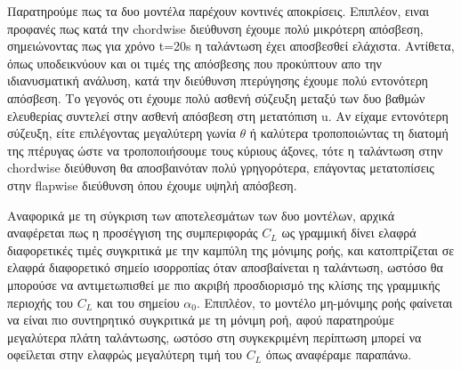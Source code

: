 \newpage
Παρατηρούμε πως τα δυο μοντέλα παρέχουν κοντινές αποκρίσεις. Επιπλέον, ειναι προφανές πως κατά την chordwise διεύθυνση έχουμε πολύ μικρότερη απόσβεση, σημειώνοντας πως για χρόνο t=20s η ταλάντωση έχει αποσβεσθεί ελάχιστα. Αντίθετα, όπως υποδεικνύουν και οι τιμές της απόσβεσης που προκύπτουν απο την ιδιανυσματική ανάλυση, κατά την διεύθυνση πτερύγησης έχουμε πολύ εντονότερη απόσβεση. Το γεγονός οτι έχουμε πολύ ασθενή σύζευξη μεταξύ των δυο βαθμών ελευθερίας συντελεί στην ασθενή απόσβεση στη μετατόπιση u. Αν είχαμε εντονότερη σύζευξη, είτε επιλέγοντας μεγαλύτερη γωνία $\theta$ ή καλύτερα τροποποιώντας τη διατομή της πτέρυγας ώστε να τροποποιήσουμε τους κύριους άξονες, τότε η ταλάντωση στην chordwise διεύθυνση θα αποσβαινόταν πολύ γρηγορότερα, επάγοντας μετατοπίσεις στην flapwise διεύθυνση όπου έχουμε υψηλή απόσβεση.

Αναφορικά με τη σύγκριση των αποτελεσμάτων των δυο μοντέλων, αρχικά αναφέρεται πως η προσέγγιση της συμπεριφοράς $C_L$ ως γραμμική δίνει ελαφρά διαφορετικές τιμές συγκριτικά με την καμπύλη της μόνιμης ροής, και κατοπτρίζεται σε ελαφρά διαφορετικό σημείο ισορροπίας όταν αποσβαίνεται η ταλάντωση, ωστόσο θα μπορούσε να αντιμετωπισθεί με πιο ακριβή προσδιορισμό της κλίσης της γραμμικής περιοχής του $C_L$ και του σημείου $\alpha_0$. Επιπλέον, το μοντέλο μη-μόνιμης ροής φαίνεται να είναι πιο συντηρητικό συγκριτικά με τη μόνιμη ροή, αφού παρατηρούμε μεγαλύτερα πλάτη ταλάντωσης, ωστόσο στη συγκεκριμένη περίπτωση μπορεί να οφείλεται στην ελαφρώς μεγαλύτερη τιμή του $C_L$ όπως αναφέραμε παραπάνω. 


\label{TextLastPage}
